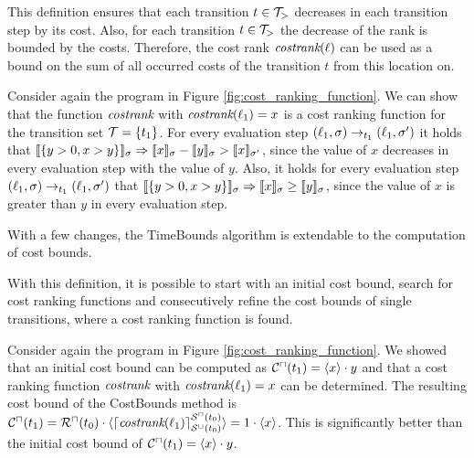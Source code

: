 This definition ensures that each transition $t \in \mathcal{T}_>$ decreases in each transition step by its cost.
Also, for each transition $t \in \mathcal{T}_>$ the decrease of the rank  is bounded by the costs.
Therefore, the cost rank $\emph{costrank}(\ell)$ can be used as a bound on the sum of all occurred costs of the transition $t$ from this location on.

\begin{example}
  Consider again the program in Figure \ref{fig:cost_ranking_function}.
  We can show that the function $\emph{costrank}$ with $\emph{costrank}(\ell_1) = x$ is a cost ranking function for the transition set $\mathcal{T} = \lbrace t_1 \rbrace$.
  For every evaluation step $(\ell_1,\sigma) \rightarrow_{t_1} (\ell_1,\sigma')$ it holds that $\llbracket \lbrace y > 0, x > y \rbrace \rrbracket_{\sigma} \Rightarrow \llbracket x \rrbracket_{\sigma} - \llbracket y \rrbracket_{\sigma} > \llbracket x \rrbracket_{\sigma'}$, since the value of $x$ decreases in every evaluation step with the value of $y$.
  Also, it holds for every evaluation step $(\ell_1,\sigma) \rightarrow_{t_1} (\ell_1,\sigma')$ that $\llbracket \lbrace y > 0, x > y \rbrace \rrbracket_{\sigma} \Rightarrow \llbracket x \rrbracket_{\sigma} \geq \llbracket y \rrbracket_{\sigma}$, since the value of $x$ is greater than $y$ in every evaluation step.
\end{example}

With a few changes, the TimeBounds algorithm is extendable to the computation of cost bounds.



With this definition, it is possible to start with an initial cost bound, search for cost ranking functions and consecutively refine the cost bounds of single transitions, where a cost ranking function is found.

\begin{example}[CostBounds]
  Consider again the program in Figure \ref{fig:cost_ranking_function}.
  We showed that an initial cost bound can be computed as ${\mathcal{C}^\sqcap}(t_1) = \langle x\rangle \cdot y$ and that a cost ranking function $\emph{costrank}$ with $\emph{costrank}(\ell_1) = x$ can be determined.
  The resulting cost bound of the CostBounds method is ${\mathcal{C}^\sqcap}(t_1) = {\mathcal{R}^\sqcap}(t_0) \cdot \langle\lceil \emph{costrank}(\ell_1) \rceil^{{\mathcal{S}^\sqcap}(t_0)}_{{\mathcal{S}^\sqcup}(t_0)}\rangle = 1 \cdot \langle x\rangle$.
  This is significantly better than the initial cost bound of ${\mathcal{C}^\sqcap}(t_1) = \langle x\rangle \cdot y$.
\end{example}

